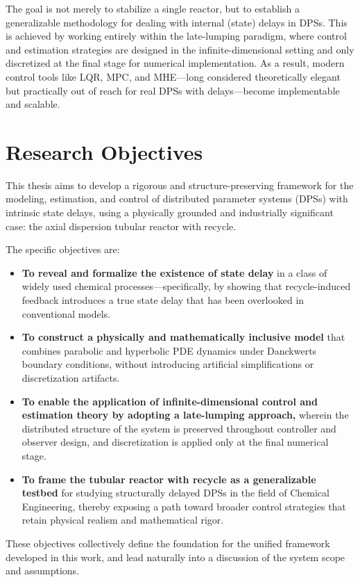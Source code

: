 The goal is not merely to stabilize a single reactor, but to establish a generalizable methodology for dealing with internal (state) delays in DPSs. This is achieved by working entirely within the late-lumping paradigm, where control and estimation strategies are designed in the infinite-dimensional setting and only discretized at the final stage for numerical implementation. As a result, modern control tools like LQR, MPC, and MHE—long considered theoretically elegant but practically out of reach for real DPSs with delays—become implementable and scalable.

\section{Research Objectives}

This thesis aims to develop a rigorous and structure-preserving framework for the modeling, estimation, and control of distributed parameter systems (DPSs) with intrinsic state delays, using a physically grounded and industrially significant case: the axial dispersion tubular reactor with recycle.

The specific objectives are:
\begin{itemize}
	\item \textbf{To reveal and formalize the existence of state delay} in a class of widely used chemical processes—specifically, by showing that recycle-induced feedback introduces a true state delay that has been overlooked in conventional models.
	\item \textbf{To construct a physically and mathematically inclusive model} that combines parabolic and hyperbolic PDE dynamics under Danckwerts boundary conditions, without introducing artificial simplifications or discretization artifacts.
	\item \textbf{To enable the application of infinite-dimensional control and estimation theory by adopting a late-lumping approach,} wherein the distributed structure of the system is preserved throughout controller and observer design, and discretization is applied only at the final numerical stage.
	\item \textbf{To frame the tubular reactor with recycle as a generalizable testbed} for studying structurally delayed DPSs in the field of Chemical Engineering, thereby exposing a path toward broader control strategies that retain physical realism and mathematical rigor.
\end{itemize}

These objectives collectively define the foundation for the unified framework developed in this work, and lead naturally into a discussion of the system scope and assumptions.


